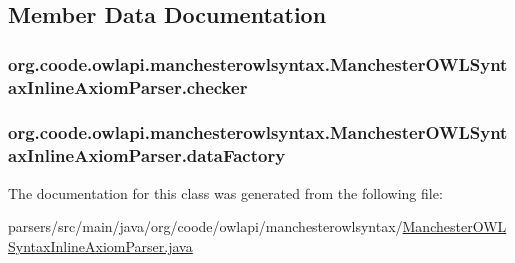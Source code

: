 \subsection{Member Data Documentation}
\hypertarget{classorg_1_1coode_1_1owlapi_1_1manchesterowlsyntax_1_1_manchester_o_w_l_syntax_inline_axiom_parser_ae5d59c1147b4c9f1dc1dfca067f4992e}{
\subsubsection[{checker}]{ org.\-coode.\-owlapi.\-manchesterowlsyntax.\-Manchester\-O\-W\-L\-Syntax\-Inline\-Axiom\-Parser.\-checker\hspace{0.3cm}{\ttfamily [private]}}}\label{classorg_1_1coode_1_1owlapi_1_1manchesterowlsyntax_1_1_manchester_o_w_l_syntax_inline_axiom_parser_ae5d59c1147b4c9f1dc1dfca067f4992e}
\hypertarget{classorg_1_1coode_1_1owlapi_1_1manchesterowlsyntax_1_1_manchester_o_w_l_syntax_inline_axiom_parser_add48cc53177673001a4f3becee83d679}{
\subsubsection[{data\-Factory}]{ org.\-coode.\-owlapi.\-manchesterowlsyntax.\-Manchester\-O\-W\-L\-Syntax\-Inline\-Axiom\-Parser.\-data\-Factory\hspace{0.3cm}{\ttfamily [private]}}}\label{classorg_1_1coode_1_1owlapi_1_1manchesterowlsyntax_1_1_manchester_o_w_l_syntax_inline_axiom_parser_add48cc53177673001a4f3becee83d679}


The documentation for this class was generated from the following file\-:\begin{DoxyCompactItemize}
\item 
parsers/src/main/java/org/coode/owlapi/manchesterowlsyntax/\hyperlink{_manchester_o_w_l_syntax_inline_axiom_parser_8java}{Manchester\-O\-W\-L\-Syntax\-Inline\-Axiom\-Parser.\-java}\end{DoxyCompactItemize}
